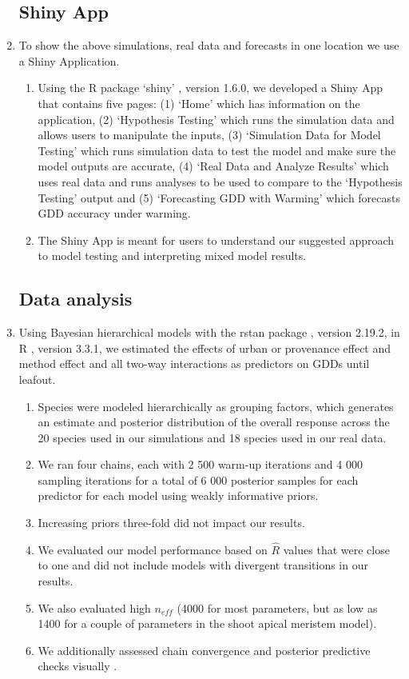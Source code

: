 \documentclass{article}\usepackage[]{graphicx}\usepackage[]{color}
\begin{document}
\begin{enumerate}
\subsection*{Shiny App}
\item To show the above simulations, real data and forecasts in one location we use a Shiny Application. 
  \begin{enumerate}
  \item Using the R package `shiny' \citep{shiny2021}, version 1.6.0, we developed a Shiny App that contains five pages: (1) `Home' which has information on the application, (2) `Hypothesis Testing' which runs the simulation data and allows users to manipulate the inputs, (3) `Simulation Data for Model Testing' which runs simulation data to test the model and make sure the model outputs are accurate, (4) `Real Data and Analyze Results' which uses real data and runs analyses to be used to compare to the `Hypothesis Testing' output and (5) `Forecasting GDD with Warming' which forecasts GDD accuracy under warming. 
  \item The Shiny App is meant for users to understand our suggested approach to model testing and interpreting mixed model results. 
  \end{enumerate}

\subsection*{Data analysis}
\item Using Bayesian hierarchical models with the rstan package \citep{rstan2019}, version 2.19.2,  in R \citep{R}, version 3.3.1, we estimated the effects of urban or provenance effect and method effect and all two-way interactions as predictors on GDDs until leafout. 
  \begin{enumerate} 
  \item Species were modeled hierarchically as grouping factors, which generates an estimate and posterior distribution of the overall response across the 20 species used in our simulations and 18 species used in our real data.
  \item We ran four chains, each with 2 500 warm-up iterations and 4 000 sampling iterations for a total of 6 000 posterior samples for each predictor for each model using weakly informative priors.
  \item Increasing priors three-fold did not impact our results.
  \item We evaluated our model performance based on $\hat{R}$ values that were close to one and did not include models with divergent transitions in our results. 
  \item We also evaluated high $n_{eff}$ (4000 for most parameters, but as low as 1400 for a couple of parameters in the shoot apical meristem model). 
  \item We additionally assessed chain convergence and posterior predictive checks visually \citep{BDA}.
  \end{enumerate}
\end{enumerate}
\end{document}
